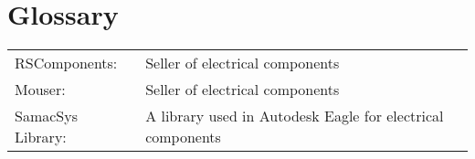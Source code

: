 \documentclass[12pt]{article}
\begin{document}

\newpage










\newpage
\section*{Glossary}

\begin{table}[H]
\begin{tabular}{ l l }
  RSComponents: & Seller of electrical components \\
  Mouser:       & Seller of electrical components \\
  SamacSys Library:     & A library used in Autodesk Eagle for electrical components \\
\end{tabular}
\end{table}
\vspace{3cm}




\end{document}

